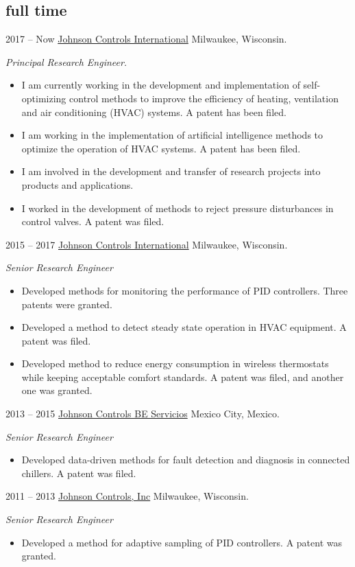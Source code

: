 \documentclass[]{friggeri-cv} %
\begin{document}
\subsection{full time}

\begin{entrylist}


\entry
{2017 -- Now}
{\href{http://www.johnsoncontrols.com}{Johnson Controls International}}
{Milwaukee, Wisconsin.}
{
\emph{Principal Research Engineer.}
\begin{itemize}
	\item I am currently working in the development and implementation of self-optimizing control methods to improve the efficiency of heating, ventilation and air conditioning (HVAC) systems. A patent has been filed.
	\item I am working in the implementation of artificial intelligence methods to optimize the operation of HVAC systems. A patent has been filed.
	\item I am involved in the development and transfer of research projects into products and applications.
   \item I worked in the development of methods to reject pressure disturbances in control valves. A patent was filed.
   
\end{itemize}
}
\entry
{2015 -- 2017}
{\href{http://www.johnsoncontrols.com}{Johnson Controls International}}
{Milwaukee, Wisconsin.}
{
\emph{Senior Research Engineer}
\begin{itemize}
\item Developed methods for monitoring the performance of PID controllers. Three patents were granted.
\item Developed a method to detect steady state operation in HVAC equipment. A patent was filed.
\item Developed method to reduce energy consumption in wireless thermostats while keeping acceptable comfort standards. A patent was filed, and another one was granted.
\end{itemize}
}

\entry
{2013 -- 2015}
{\href{http://www.johnsoncontrols.com/es_mx}{Johnson Controls BE Servicios}}
{Mexico City, Mexico.}
{
\emph{Senior Research Engineer}
\begin{itemize}
\item Developed data-driven methods for fault detection and diagnosis in connected chillers. A patent was filed.
\end{itemize}
}

\entry
{2011 -- 2013}
{\href{http://www.johnsoncontrols.com}{Johnson Controls, Inc}}
{Milwaukee, Wisconsin.}
{
\emph{Senior Research Engineer}
\begin{itemize}
\item Developed a method for adaptive sampling of PID controllers. A patent was granted.
\end{itemize}
}

\end{entrylist}
\end{document}

